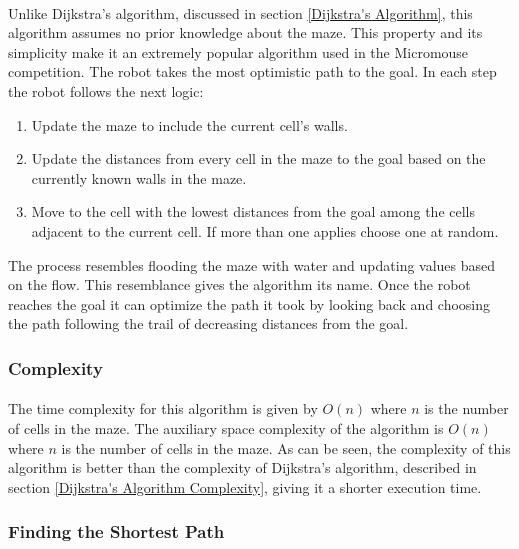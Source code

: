 \documentclass[12pt]{article}
\begin{document}
\paragraph{}
Unlike Dijkstra's algorithm, discussed in section \ref{Dijkstra's Algorithm}, this algorithm assumes no prior knowledge about the \gls{maze}.
This property and its simplicity make it an extremely popular algorithm used in the \gls{Micromouse} competition.
The robot takes the most optimistic path to the goal.
In each step the robot follows the next logic:
\begin{enumerate}
    \item Update the \gls{maze} to include the current \gls{cell}'s walls.
    \item Update the distances from every \gls{cell} in the \gls{maze} to the goal based on the currently known walls in the \gls{maze}.
    \item Move to the \gls{cell} with the lowest distances from the goal among the \gls{cell}s adjacent to the current \gls{cell}. If more than one applies choose one at random.
\end{enumerate}

The process resembles flooding the \gls{maze} with water and updating values based on the flow.
This resemblance gives the algorithm its name.
Once the robot reaches the goal it can optimize the path it took by looking back and choosing the path following the trail of decreasing distances from the goal.

\subsubsection{Complexity}
\paragraph{}
The time complexity for this algorithm is given by $O(n)$ where $n$ is the number of \gls{cell}s in the \gls{maze}.
The \gls{auxiliary space} complexity of the algorithm is $O(n)$ where $n$ is the number of \gls{cell}s in the \gls{maze}.
As can be seen, the complexity of this algorithm is better than the complexity of Dijkstra's algorithm, described in section \ref{Dijkstra's Algorithm Complexity}, giving it a shorter execution time.

\subsubsection{Finding the Shortest Path} \label{Flood Fill - Finding the Shortest Path}
\end{document}
